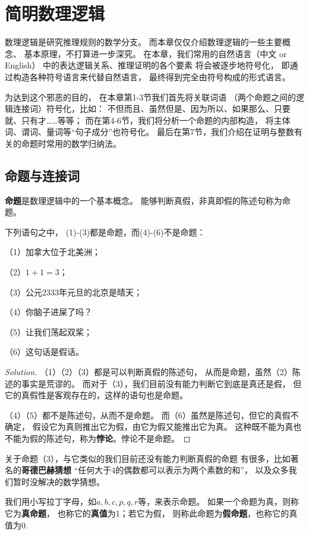 \section{简明数理逻辑}

数理逻辑是研究推理规则的数学分支。
而本章仅仅介绍数理逻辑的一些主要概念、
基本原理，不打算进一步深究。
在本章，我们常用的自然语言（中文 or English）
中的表达逻辑关系、推理证明的各个要素
将会被逐步地符号化，
即通过构造各种符号语言来代替自然语言，
最终得到完全由符号构成的形式语言。

为达到这个邪恶的目的，
在本章第1-3节我们首先将关联词语
（两个命题之间的逻辑连接词）符号化，比如：
不但而且、虽然但是、因为所以、如果那么、只要就、只有才……等等；
而在第4-6节，我们将分析一个命题的内部构造，
将主体词、谓词、量词等“句子成分”也符号化。
最后在第7节，我们介绍在证明与整数有关的命题时常用的数学归纳法。

\subsection{命题与连接词}
\textbf{命题}是数理逻辑中的一个基本概念。
能够判断真假，非真即假的陈述句称为命题。

\begin{example}下列语句之中，
(1)-(3)都是命题，而(4)-(6)不是命题：

（1）加拿大位于北美洲；

（2）$1+1=3$；

（3）公元2333年元旦的北京是晴天；

（4）你脑子进屎了吗？

（5）让我们荡起双桨；

（6）这句话是假话。\label{examples of propositions}
\end{example}
\begin{proof}[Solution]
（1）（2）（3）都是可以判断真假的陈述句，
从而是命题，虽然（2）陈述的事实是荒谬的。
而对于（3），我们目前没有能力判断它到底是真还是假，
但它的真假性是客观存在的，这样的语句也是命题。

（4）（5）都不是陈述句，从而不是命题。
而（6）虽然是陈述句，但它的真假不确定，
假设它为真则推出它为假，由它为假又能推出它为真。
这种既不能为真也不能为假的陈述句，称为\textbf{悖论}。悖论不是命题。
\end{proof}

关于命题（3），与它类似的我们目前还没有能力判断真假的命题
有很多，比如著名的\textbf{哥德巴赫猜想}
“任何大于$4$的偶数都可以表示为两个素数的和”，
以及众多我们暂时没解决的数学猜想。\vsp

我们用小写拉丁字母，如$a,b,c,p,q,r$等，来表示命题。
如果一个命题为真，则称它为\textbf{真命题}，
也称它的\textbf{真值}为1；若它为假，
则称此命题为\textbf{假命题}，也称它的真值为0.\vsp

